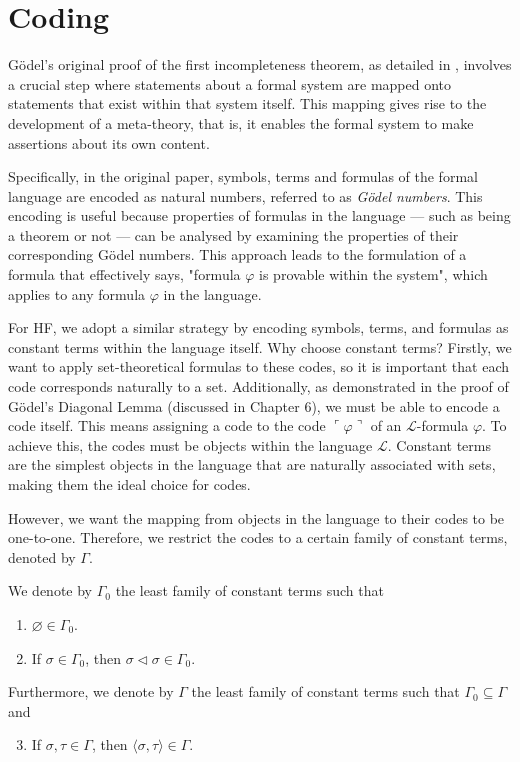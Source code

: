 \chapter{Coding}

Gödel's original proof of the first incompleteness theorem, 
as detailed in \cite{godel1931formal}, 
involves a crucial step where statements about a formal system are mapped onto statements that 
exist within that system itself. 
This mapping gives rise to the development of a meta-theory, that is, 
it enables the formal system to make assertions about its own content.

Specifically, in the original paper, symbols, terms and formulas of the formal language are encoded 
as natural numbers, referred to as \textit{Gödel numbers}. 
This encoding is useful because properties of formulas in the language 
— such as being a theorem or not — 
can be analysed by examining the properties of their corresponding Gödel numbers. 
This approach leads to the formulation of a formula that effectively says, 
"formula $\varphi$ is provable within the system", 
which applies to any formula $\varphi$ in the language.

For HF, we adopt a similar strategy by encoding symbols, terms, and formulas 
as constant terms within the language itself. Why choose constant terms?
Firstly, we want to apply set-theoretical formulas to these codes, 
so it is important that each code corresponds naturally to a set. 
Additionally, as demonstrated in the proof of Gödel’s Diagonal Lemma (discussed in Chapter 6), 
we must be able to encode a code itself. 
This means assigning a code to the code $\ulcorner{\varphi}\urcorner$ of an 
$\mathcal{L}$-formula $\varphi$. 
To achieve this, the codes must be objects within the language $\mathcal{L}$. 
Constant terms are the simplest objects in the language that are naturally associated with sets, 
making them the ideal choice for codes.

However, we want the mapping from objects in the language to their codes to be one-to-one.
Therefore, we restrict the codes to a certain family of constant terms, denoted by $\Gamma$.

\begin{definition}
    \label{def:C.IsInΓ0+C.IsInΓ+Code}
    \leanok
    We denote by $\Gamma_0$ the least family of constant terms such that
    \begin{enumerate}
        \item $\varnothing \in \Gamma_0$.
        \item If $\sigma \in \Gamma_0$, then $\sigma \lhd \sigma \in \Gamma_0$.
    \end{enumerate}
    Furthermore, we denote by $\Gamma$ the least family of constant terms such that
    $\Gamma_0 \subseteq \Gamma$ and 
    \begin{enumerate}\setcounter{enumi}{2} %
        \item If $\sigma, \tau \in \Gamma$, then $\langle\sigma, \tau\rangle \in \Gamma$.
    \end{enumerate}
\end{definition}

